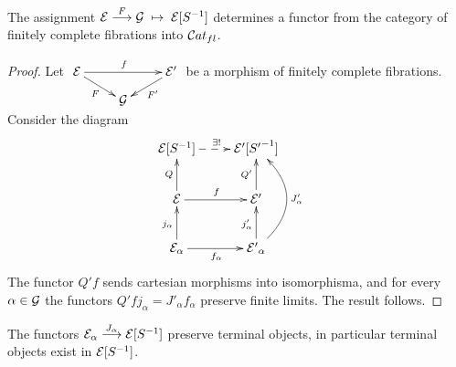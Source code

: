  
\begin{corollary}\label{funtorialidad}
The assignment $\mathcal{E} \overset {F} {\longrightarrow} \mathcal{G} \; \mapsto  \; \mathcal{E}[S^{-1}]$     determines a functor from the category of finitely complete fibrations into $\mathcal{C}at_{fl}$.
\end{corollary}
\begin{proof}
Let 
$\xymatrix@R=2ex{ \cc{E} \ar[rr]^f \ar[dr]_{F} && \cc{E'} \ar[dl]^{F'}
\\ & \cc{G}}$
be a morphism of finitely complete fibrations. Consider the  diagram
$$
\xymatrix
     {
      \cc{E}[S^{-1}]  \ar@{-->}[r]^{\exists !} 
    & \cc{E'}[{S'}^{-1}] 
  \\
	  \cc{E} \ar[u]^Q \ar[r]^f 
	& \cc{E'} \ar[u]^{Q'} 
	& 
  \\
	  \cc{E}_\alpha \ar[r]_{f_\alpha} 
	                \ar[u]^{j_\alpha} 
	& \cc{E'}_{\alpha} \ar[u]^{j'_{\alpha}} 
	                    \ar@/_2pc/[uu]_{J'_{\alpha}} 
	 }
$$
The functor $Q' f$ sends cartesian morphisms into isomorphisma, and for every
${\alpha \in \mathcal{G}}$ the functors 
$Q'f j_\alpha = J'_{\alpha} f_\alpha$ preserve finite limits.
The result follows.
\end{proof}
 \begin{sinnadastandard}
 \label{prueba}

\end{sinnadastandard}
\begin{proposition}\label{fibras preservan terminal object}
The functors $\mathcal{E}_\alpha \overset {J_\alpha} {\longrightarrow} \mathcal{E}[S^{-1}]$ preserve terminal objects, in particular terminal objects exist in 
$\mathcal{E}[S^{-1}]$.
\end{proposition}
